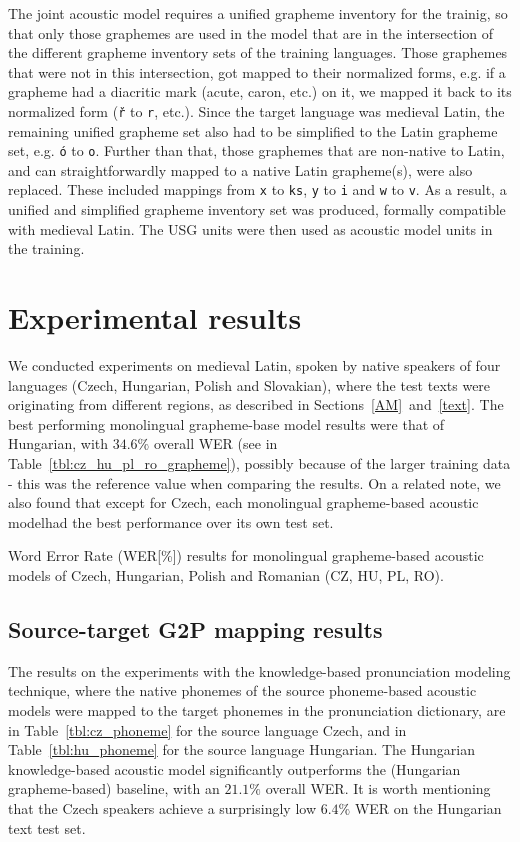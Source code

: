 \documentclass[runningheads,a4paper]{llncs}
\begin{document}
The joint acoustic model requires a unified grapheme inventory for the trainig, so that only those graphemes are used in the model that are in the intersection of the different grapheme inventory sets of the training languages.
Those graphemes that were not in this intersection, got mapped to their normalized forms, e.g. if a grapheme had a diacritic mark (acute, caron, etc.) on it, we mapped it back to its normalized form (\texttt{\v{r}} to \texttt{r}, etc.).
Since the target language was medieval Latin, the remaining unified grapheme set also had to be simplified to the Latin grapheme set, e.g. \texttt{\'{o}} to \texttt{o}.
Further than that, those graphemes that are non-native to Latin, and can straightforwardly mapped to a native Latin grapheme(s), were also replaced.
These included mappings from \texttt{x} to \texttt{ks}, \texttt{y} to \texttt{i} and \texttt{w} to \texttt{v}.
As a result, a unified and simplified grapheme inventory set was produced, formally compatible with medieval Latin.
The USG units were then used as acoustic model units in the training.

\section{Experimental results}\label{results}
We conducted experiments on medieval Latin, spoken by native speakers of four languages (Czech, Hungarian, Polish and Slovakian), where the test texts were originating from different regions, as described in Sections~\ref{AM}~and~\ref{text}.
The best performing monolingual grapheme-base model results were that of Hungarian, with $34.6\%$ overall WER (see in Table~\ref{tbl:cz_hu_pl_ro_grapheme}), possibly because of the larger training data - this was the reference value when comparing the results.
On a related note, we also found that except for Czech, each monolingual grapheme-based acoustic modelhad the best performance over its own test set.

\begin{table}
\centering
\caption{Word Error Rate (WER[\%]) results for monolingual grapheme-based acoustic models of Czech, Hungarian, Polish and Romanian (CZ, HU, PL, RO).}
\label{tbl:cz_hu_pl_ro_grapheme}
\end{table}

\subsection{Source-target G2P mapping results}
The results on the experiments with the knowledge-based pronunciation modeling technique, where the native phonemes of the source phoneme-based acoustic models were mapped to the target phonemes in the pronunciation dictionary, are in Table~\ref{tbl:cz_phoneme} for the source language Czech, and in Table~\ref{tbl:hu_phoneme} for the source language Hungarian.
The Hungarian knowledge-based acoustic model significantly outperforms the (Hungarian grapheme-based) baseline, with an $21.1\%$ overall WER.
It is worth mentioning that the Czech speakers achieve a surprisingly low $6.4\%$ WER on the Hungarian text test set.
\end{document}
